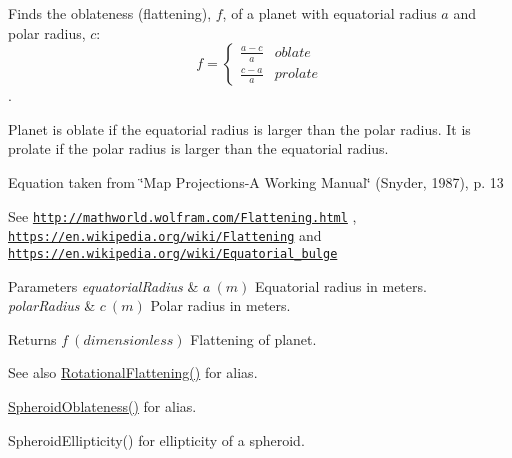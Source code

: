 Finds the oblateness (flattening), $f$, of a planet with equatorial radius $a$ and polar radius, $c$\+: \[ f =\begin{cases} \frac{a-c}{a}{} & oblate \\ \frac{c-a}{a} & prolate \end{cases} \]. 

Planet is oblate if the equatorial radius is larger than the polar radius. It is prolate if the polar radius is larger than the equatorial radius.

Equation taken from \char`\"{}\+Map Projections-\/\+A Working Manual\char`\"{} (Snyder, 1987), p. 13

See \href{http://mathworld.wolfram.com/Flattening.html}{\tt http\+://mathworld.\+wolfram.\+com/\+Flattening.\+html} , \href{https://en.wikipedia.org/wiki/Flattening}{\tt https\+://en.\+wikipedia.\+org/wiki/\+Flattening} and \href{https://en.wikipedia.org/wiki/Equatorial_bulge}{\tt https\+://en.\+wikipedia.\+org/wiki/\+Equatorial\+\_\+bulge} 
\begin{DoxyParams}{Parameters}
{\em equatorial\+Radius} & $ a\ (m)$ Equatorial radius in meters. \\
\hline
{\em polar\+Radius} & $ c\ (m)$ Polar radius in meters. \\
\hline
\end{DoxyParams}
\begin{DoxyReturn}{Returns}
$ f\ (dimensionless)$ Flattening of planet. 
\end{DoxyReturn}
\begin{DoxySeeAlso}{See also}
\mbox{\hyperlink{group___e_g_x_phys-_astrophysics-_rotational_flattening_ga316b9afb6e1aa940fa96417c6f24ed4d}{Rotational\+Flattening()}} for alias. 

\mbox{\hyperlink{group___e_g_x_math-_geometry-3_d-_spheroid-_flattening_ga8f547f5dd10721862b602c7769eb6116}{Spheroid\+Oblateness()}} for alias. 

Spheroid\+Ellipticity() for ellipticity of a spheroid. 
\end{DoxySeeAlso}
\mbox{\label{group___e_g_x_phys-_astrophysics-_rotational_flattening_ga7d78d01c8b3e1a9b2e4f17cb67969a88}} 
